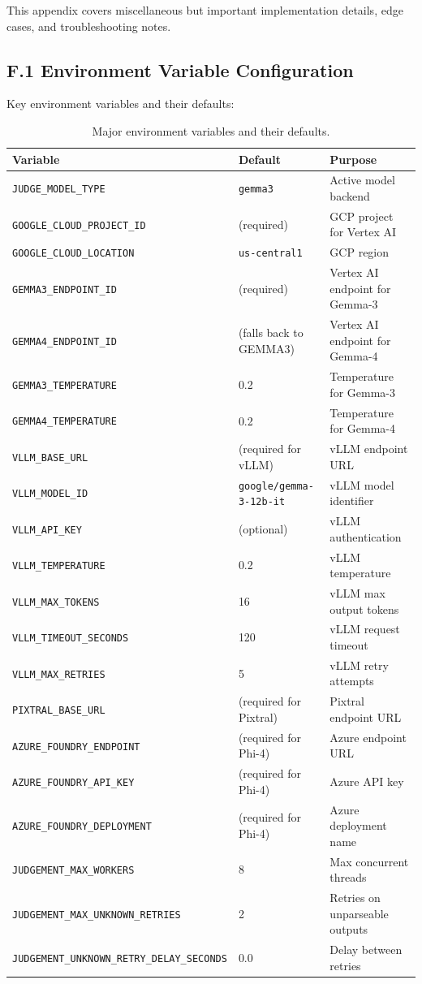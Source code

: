 This appendix covers miscellaneous but important implementation details, edge cases, and troubleshooting notes.

\subsection*{F.1 Environment Variable Configuration}

Key environment variables and their defaults:

\begin{table}[H]
\centering
\small
\begin{tabular}{|l|l|l|}
\hline
\textbf{Variable} & \textbf{Default} & \textbf{Purpose} \\
\hline
\texttt{JUDGE\_MODEL\_TYPE} & \texttt{gemma3} & Active model backend \\
\texttt{GOOGLE\_CLOUD\_PROJECT\_ID} & (required) & GCP project for Vertex AI \\
\texttt{GOOGLE\_CLOUD\_LOCATION} & \texttt{us-central1} & GCP region \\
\texttt{GEMMA3\_ENDPOINT\_ID} & (required) & Vertex AI endpoint for Gemma-3 \\
\texttt{GEMMA4\_ENDPOINT\_ID} & (falls back to GEMMA3) & Vertex AI endpoint for Gemma-4 \\
\texttt{GEMMA3\_TEMPERATURE} & 0.2 & Temperature for Gemma-3 \\
\texttt{GEMMA4\_TEMPERATURE} & 0.2 & Temperature for Gemma-4 \\
\texttt{VLLM\_BASE\_URL} & (required for vLLM) & vLLM endpoint URL \\
\texttt{VLLM\_MODEL\_ID} & \texttt{google/gemma-3-12b-it} & vLLM model identifier \\
\texttt{VLLM\_API\_KEY} & (optional) & vLLM authentication \\
\texttt{VLLM\_TEMPERATURE} & 0.2 & vLLM temperature \\
\texttt{VLLM\_MAX\_TOKENS} & 16 & vLLM max output tokens \\
\texttt{VLLM\_TIMEOUT\_SECONDS} & 120 & vLLM request timeout \\
\texttt{VLLM\_MAX\_RETRIES} & 5 & vLLM retry attempts \\
\texttt{PIXTRAL\_BASE\_URL} & (required for Pixtral) & Pixtral endpoint URL \\
\texttt{AZURE\_FOUNDRY\_ENDPOINT} & (required for Phi-4) & Azure endpoint URL \\
\texttt{AZURE\_FOUNDRY\_API\_KEY} & (required for Phi-4) & Azure API key \\
\texttt{AZURE\_FOUNDRY\_DEPLOYMENT} & (required for Phi-4) & Azure deployment name \\
\texttt{JUDGEMENT\_MAX\_WORKERS} & 8 & Max concurrent threads \\
\texttt{JUDGEMENT\_MAX\_UNKNOWN\_RETRIES} & 2 & Retries on unparseable outputs \\
\texttt{JUDGEMENT\_UNKNOWN\_RETRY\_DELAY\_SECONDS} & 0.0 & Delay between retries \\
\hline
\end{tabular}
\caption{Major environment variables and their defaults.}
\end{table}

